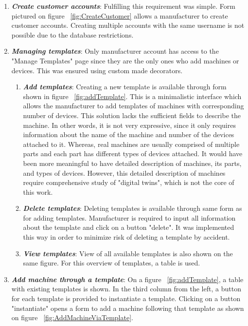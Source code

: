 \begin{enumerate}
	\setlength{\itemsep}{1pt}
	\item \textbf{\textit{Create customer accounts}}: Fulfilling this requirement was simple. Form pictured on figure ~\ref{fig:CreateCustomer} allows a manufacturer to create customer accounts. Creating multiple accounts with the same username is not possible due to the database restrictions.

	\item \textbf{\textit{Managing templates}}: Only manufacturer account has access to the "Manage Templates" page since they are the only ones who add machines or devices. This was ensured using custom made decorators.

	\begin{enumerate}
		\item \textbf{\textit{Add templates}}: Creating a new template is available through form shown in figure ~\ref{fig:addTemplate}. This is a minimalistic interface which allows the manufacturer to add templates of machines with corresponding number of devices. This solution lacks the sufficient fields to describe the machine. In other words, it is not very expressive, since it only requires information about the name of the machine and number of the devices attached to it. Whereas, real machines are usually comprised of multiple parts and each part has different types of devices attached. It would have been more meaningful to have detailed description of machines, its parts, and types of devices. However, this detailed  description of machines require comprehensive study of "digital twins", which is not the core of this work.

		\item \textbf{\textit{Delete templates}}: Deleting templates is available through same form as for adding templates. Manufacturer is required to input all information about the template and click on a button "delete". It was implemented this way in order to minimize risk of deleting a template by accident.
		\item \textbf{\textit{View templates}}: View of all available templates is also shown on the same figure. For this overview of templates, a table is used.  
	\end{enumerate}

	\item \textbf{\textit{Add machine through a template}}: On a figure ~\ref{fig:addTemplate}, a table with existing templates is shown. In the third column from the left, a button for each template is provided to instantiate a template. Clicking on a button "instantiate" opens a form to add a machine following that template as shown on figure ~\ref{fig:AddMachineViaTemplate}.


\end{enumerate}
